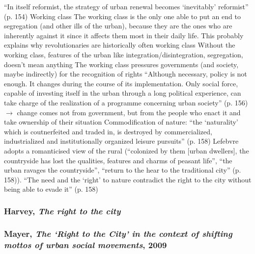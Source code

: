 \documentclass{article}
\begin{document}
\begin{outline}
	\1 ``In itself reformist, the strategy of urban renewal becomes `inevitably' reformist'' (p. 154)
	\1 Working class
		\2 The working class is the only one able to put an end to segregation (and other ills of the urban), because they are the ones who are inherently against it since it affects them most in their daily life. This probably explains why revolutionaries are historically often working class
		\2 Without the working class, features of the urban like integration/disintegration, segregation, doesn't mean anything
		\2 The working class pressures governments (and society, maybe indirectly) for the recognition of rights 
	\1 ``Although necessary, policy is not enough. It changes during the course of its implementation. Only social force, capable of investing itself in the urban through a long political experience, can take charge of the realization of a programme concerning urban society'' (p. 156) $\rightarrow$ change comes not from government, but from the people who enact it and take ownership of their situation
	\1 Commodification of nature: ``the `naturality' which is coutnerfeited and traded in, is destroyed by commercialized, industrialized and institutionally organized leisure pursuits'' (p. 158)
	\1 Lefebvre adopts a romanticised view of the rural (``colonized by them [urban dwellers], the countryside has lost the qualities, features and charms of peasant life'', ``the urban ravages the countryside'', ``return to the hear to the traditional city'' (p. 158)). 
	\1 ``The need and the `right' to nature contradict the right to the city without being able to evade it'' (p. 158) 
\end{outline}

\subsubsection{Harvey, \textit{The right to the city}}

\begin{outline}
	\1
\end{outline}

\subsubsection{Mayer, \textit{The `Right to the City' in the context of shifting mottos of urban social movements}, 2009}

\begin{outline}
	\1
\end{outline}
\end{document}
